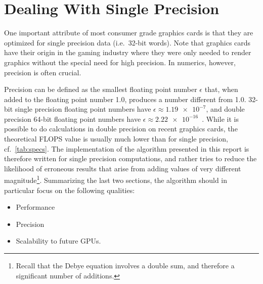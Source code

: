 \documentclass[11pt,twoside]{report}
\begin{document}



\section{Dealing With Single Precision} 
One important attribute of most consumer grade graphics cards is that they are optimized for single precision data (i.e.\ 32-bit words). Note that graphics cards have their origin in the gaming industry where they were only needed to render graphics without the special need for high precision. In numerics, however, precision is often crucial.  

\indent Precision can be defined as the smallest floating point number $\epsilon$ that, when added to the floating point number 1.0, produces a number different from 1.0. 32-bit single precision floating point numbers have $\epsilon \approx \num{1.19e-7}$, and double precision 64-bit floating point numbers have $\epsilon \approx \num{2.22e-16}$~\cite{numrec}.
 While it is possible to do calculations in double precision on recent graphics cards, the theoretical FLOPS value is usually much lower than for single precision, cf.~\cref{tab:specs}. The implementation of the algorithm presented in this report is therefore written for single precision computations, and rather tries to reduce the likelihood of erroneous results that arise from adding values of very different magnitude\footnote{Recall that the Debye equation involves a double sum, and therefore a significant number of additions.}. Summarizing the last two sections, the algorithm should in particular focus on the following qualities:  

\begin{itemize}
\item Performance 
\item Precision
\item Scalability to future GPUs.
\end{itemize} 
\end{document}
